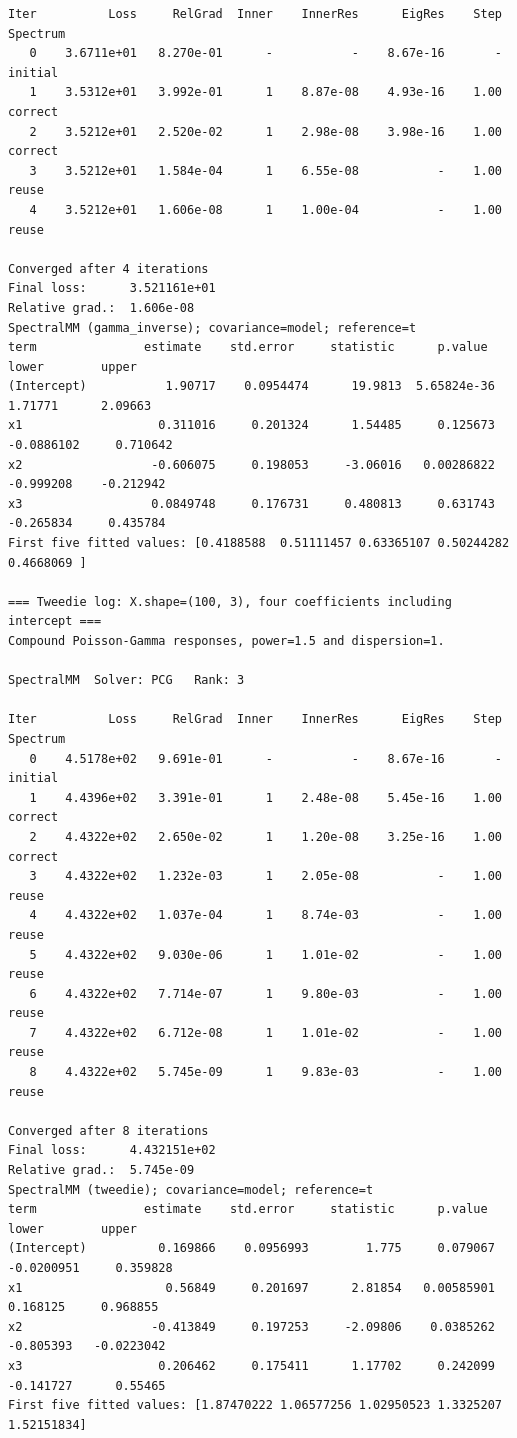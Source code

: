 \documentclass[11pt]{article}
\begin{document}
\begin{lstlisting}
Iter          Loss     RelGrad  Inner    InnerRes      EigRes    Step  Spectrum
   0    3.6711e+01   8.270e-01      -           -    8.67e-16       -  initial
   1    3.5312e+01   3.992e-01      1    8.87e-08    4.93e-16    1.00  correct
   2    3.5212e+01   2.520e-02      1    2.98e-08    3.98e-16    1.00  correct
   3    3.5212e+01   1.584e-04      1    6.55e-08           -    1.00  reuse
   4    3.5212e+01   1.606e-08      1    1.00e-04           -    1.00  reuse

Converged after 4 iterations
Final loss:      3.521161e+01
Relative grad.:  1.606e-08
SpectralMM (gamma_inverse); covariance=model; reference=t
term               estimate    std.error     statistic      p.value        lower        upper
(Intercept)           1.90717    0.0954474      19.9813  5.65824e-36      1.71771      2.09663
x1                   0.311016     0.201324      1.54485     0.125673   -0.0886102     0.710642
x2                  -0.606075     0.198053     -3.06016   0.00286822    -0.999208    -0.212942
x3                  0.0849748     0.176731     0.480813     0.631743    -0.265834     0.435784
First five fitted values: [0.4188588  0.51111457 0.63365107 0.50244282 0.4668069 ]

=== Tweedie log: X.shape=(100, 3), four coefficients including intercept ===
Compound Poisson-Gamma responses, power=1.5 and dispersion=1.

SpectralMM  Solver: PCG   Rank: 3

Iter          Loss     RelGrad  Inner    InnerRes      EigRes    Step  Spectrum
   0    4.5178e+02   9.691e-01      -           -    8.67e-16       -  initial
   1    4.4396e+02   3.391e-01      1    2.48e-08    5.45e-16    1.00  correct
   2    4.4322e+02   2.650e-02      1    1.20e-08    3.25e-16    1.00  correct
   3    4.4322e+02   1.232e-03      1    2.05e-08           -    1.00  reuse
   4    4.4322e+02   1.037e-04      1    8.74e-03           -    1.00  reuse
   5    4.4322e+02   9.030e-06      1    1.01e-02           -    1.00  reuse
   6    4.4322e+02   7.714e-07      1    9.80e-03           -    1.00  reuse
   7    4.4322e+02   6.712e-08      1    1.01e-02           -    1.00  reuse
   8    4.4322e+02   5.745e-09      1    9.83e-03           -    1.00  reuse

Converged after 8 iterations
Final loss:      4.432151e+02
Relative grad.:  5.745e-09
SpectralMM (tweedie); covariance=model; reference=t
term               estimate    std.error     statistic      p.value        lower        upper
(Intercept)          0.169866    0.0956993        1.775     0.079067   -0.0200951     0.359828
x1                    0.56849     0.201697      2.81854   0.00585901     0.168125     0.968855
x2                  -0.413849     0.197253     -2.09806    0.0385262    -0.805393   -0.0223042
x3                   0.206462     0.175411      1.17702     0.242099    -0.141727      0.55465
First five fitted values: [1.87470222 1.06577256 1.02950523 1.3325207  1.52151834]


\end{lstlisting}
\end{document}
